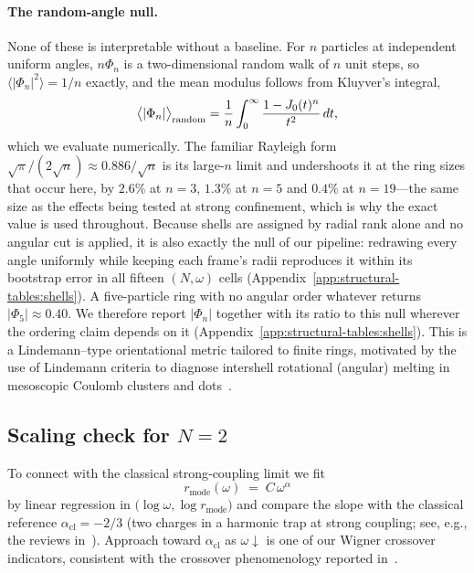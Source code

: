 \paragraph{The random-angle null.}
None of these is interpretable without a baseline. For $n$ particles at independent uniform
angles, $n\Phi_n$ is a two-dimensional random walk of $n$ unit steps, so
$\langle|\Phi_n|^2\rangle=1/n$ exactly, and the mean modulus follows from Kluyver's integral,
\begin{equation}
  \big\langle|\Phi_n|\big\rangle_{\rm random}
  =\frac1n\int_0^\infty\frac{1-J_0(t)^n}{t^2}\,dt ,
  \label{eq:phi-null-exact}
\end{equation}
which we evaluate numerically. The familiar Rayleigh form $\sqrt\pi/(2\sqrt n)\approx0.886/\sqrt n$
is its large-$n$ limit and undershoots it at the ring sizes that occur here, by $2.6\%$ at
$n=3$, $1.3\%$ at $n=5$ and $0.4\%$ at $n=19$---the same size as the effects being tested at
strong confinement, which is why the exact value is used throughout. Because shells are
assigned by radial rank alone and no angular cut is applied, it is also exactly the null of
our pipeline: redrawing every angle uniformly while keeping each frame's radii reproduces it
within its bootstrap error in all fifteen $(N,\omega)$ cells
(Appendix~\ref{app:structural-tables:shells}). A five-particle ring with no angular order
whatever returns $|\Phi_5|\approx0.40$. We therefore report $|\Phi_n|$ together with its ratio to this null
wherever the ordering claim depends on it (Appendix~\ref{app:structural-tables:shells}).
This is a Lindemann–type orientational metric tailored to finite rings, motivated by
the use of Lindemann criteria to diagnose intershell rotational (angular) melting in mesoscopic
Coulomb clusters and dots~\cite{schweigert1994spectralpropertieschargedparticles,Filinov_2001}.

\subsection{Scaling check for $N=2$}
\label{subsec:n2-scaling}

To connect with the classical strong‐coupling limit we fit 
\begin{equation}
r_{\mathrm{mode}}(\omega) \;=\; C\,\omega^{\alpha}
\end{equation}
by linear regression in $\big(\log\omega,\log r_{\mathrm{mode}}\big)$ and compare the slope with the classical reference 
$\alpha_{\mathrm{cl}}=-2/3$ (two charges in a harmonic trap at strong coupling; see, e.g., the reviews in~\cite{manninen2007metalclustersquantumdots}).
Approach toward $\alpha_{\mathrm{cl}}$ as $\omega\downarrow$ is one of our Wigner crossover indicators,
consistent with the crossover phenomenology reported in~\cite{Egger_1999,Filinov_2001}.


